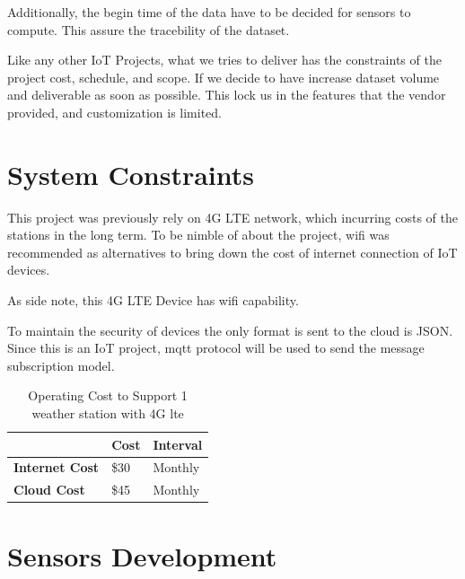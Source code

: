 \documentclass[10pt, a4paper]{article}
\begin{document}
\par Additionally, the begin time of the data have to be decided for sensors to compute. This assure the tracebility of the dataset.


\par Like any other IoT Projects, what we tries to deliver has the constraints of the project cost, schedule, and scope. If we decide to have increase dataset volume and deliverable as soon as possible. This lock us in the features that the vendor provided, and customization is limited. 

\noindent

\section{System Constraints} %
\par This project was previously rely on 4G LTE network, which incurring costs of the stations in the long term. To be nimble of about the project, wifi was recommended as alternatives to bring down the cost of internet connection of IoT devices.
\par As side note, this 4G LTE Device has wifi capability.

\par To maintain the security of devices the only format is sent to the cloud is JSON. Since this is an IoT project, mqtt protocol will be used to send the message subscription model.


\begin{table}[!ht]
    \centering
    \caption{Operating Cost to Support 1 weather station with 4G lte}
    \begin{tabular}{|l|l|l|}
    \hline
    ~  & \textbf{Cost} & \textbf{Interval} \\ \hline
        \textbf{Internet Cost} & \$30 & Monthly \\ \hline
        \textbf{Cloud Cost } & \$45 & Monthly \\ \hline
    \end{tabular}
\end{table}
\section{Sensors  Development} %
\end{document}
